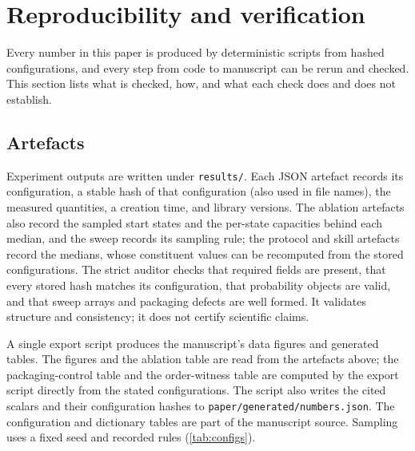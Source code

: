 \section{Reproducibility and verification}
\label{sec:repro}

Every number in this paper is produced by deterministic scripts from hashed configurations, and every step from code to manuscript can be rerun and checked. This section lists what is checked, how, and what each check does and does not establish.

\subsection{Artefacts}
Experiment outputs are written under \texttt{results/}. Each JSON artefact records its configuration, a stable hash of that configuration (also used in file names), the measured quantities, a creation time, and library versions. The ablation artefacts also record the sampled start states and the per-state capacities behind each median, and the sweep records its sampling rule; the protocol and skill artefacts record the medians, whose constituent values can be recomputed from the stored configurations. The strict auditor checks that required fields are present, that every stored hash matches its configuration, that probability objects are valid, and that sweep arrays and packaging defects are well formed. It validates structure and consistency; it does not certify scientific claims.

A single export script produces the manuscript's data figures and generated tables. The figures and the ablation table are read from the artefacts above; the packaging-control table and the order-witness table are computed by the export script directly from the stated configurations. The script also writes the cited scalars and their configuration hashes to \texttt{paper/generated/numbers.json}. The configuration and dictionary tables are part of the manuscript source. Sampling uses a fixed seed and recorded rules (\cref{tab:configs}).

